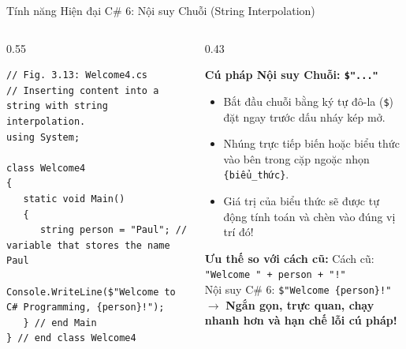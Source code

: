 \documentclass[aspectratio=169, 10pt]{beamer}
\begin{document}
\begin{frame}[fragile]{Tính năng Hiện đại C\# 6: Nội suy Chuỗi (String Interpolation)}
  \begin{columns}[T]
    \begin{column}{0.55\textwidth}
      \begin{tcolorbox}[colback=CodeBg,colframe=CSharpPurple,title=\textbf{Welcome4.cs (Fig. 3.13)},fonttitle=\small\bfseries]
\begin{lstlisting}
// Fig. 3.13: Welcome4.cs
// Inserting content into a string with string interpolation.
using System;

class Welcome4
{
   static void Main()
   {
      string person = "Paul"; // variable that stores the name Paul
      Console.WriteLine($"Welcome to C# Programming, {person}!");
   } // end Main
} // end class Welcome4
\end{lstlisting}
      \end{tcolorbox}
    \end{column}

    \begin{column}{0.43\textwidth}
      \begin{block}{\textbf{Cú pháp Nội suy Chuỗi: \texttt{\$"..."}}}
        \begin{itemize}\small
          \item Bắt đầu chuỗi bằng ký tự đô-la (\texttt{\$}) đặt ngay trước dấu nháy kép mở.
          \item Nhúng trực tiếp biến hoặc biểu thức vào bên trong cặp ngoặc nhọn \texttt{\{biểu\_thức\}}.
          \item Giá trị của biểu thức sẽ được tự động tính toán và chèn vào đúng vị trí đó!
        \end{itemize}
      \end{block}

      \begin{exampleblock}{\textbf{Ưu thế so với cách cũ:}}
        Cách cũ: \texttt{"Welcome " + person + "!"}\\
        Nội suy C\# 6: \texttt{\$"Welcome \{person\}!"}\\
        $\to$ \textbf{Ngắn gọn, trực quan, chạy nhanh hơn và hạn chế lỗi cú pháp!}
      \end{exampleblock}
    \end{column}
  \end{columns}
\end{frame}
\end{document}

